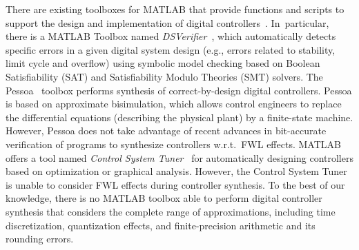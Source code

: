 \documentclass[conference]{IEEEtran}
\begin{document}
There are existing toolboxes for MATLAB that provide functions and scripts
to support the design and implementation of digital
controllers~\cite{matlab-toolbox}.  In~particular, there is a MATLAB Toolbox
named \emph{DSVerifier}~\cite{issta2017, DBLP:journals/tc/BessaIPCF17,
DBLP:journals/dafes/BessaICF16}, which automatically detects specific errors
in a given digital system design (e.g., errors related to stability, limit
cycle and overflow) using symbolic model checking based on Boolean
Satisfiability (SAT) and Satisfiability Modulo Theories (SMT) solvers.  The
Pessoa~\cite{mazo2010pessoa} toolbox performs synthesis of correct-by-design
digital controllers.  Pessoa is based on approximate bisimulation, which
allows control engineers to replace the differential equations (describing the
physical plant) by a finite-state machine.  However, Pessoa does
not take advantage of recent advances in bit-accurate verification of
programs to synthesize controllers w.r.t.~FWL effects.  MATLAB offers a tool
named \emph{Control System Tuner}~\cite{autotuner} for automatically
designing controllers based on optimization or graphical analysis.  However,
the Control System Tuner is unable to consider FWL effects during controller
synthesis. %
To the best of our knowledge, there is no MATLAB toolbox able to
perform digital controller synthesis that considers the complete range of
approximations, including time discretization, quantization effects, and
finite-precision arithmetic and its rounding errors.

\end{document}
